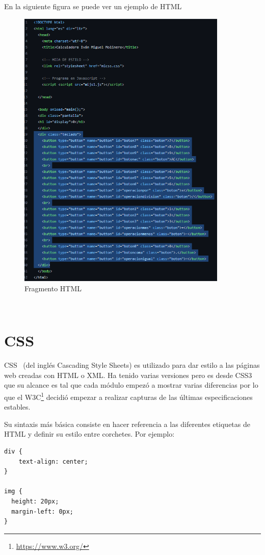 \documentclass[a4paper, 12pt]{book}
\begin{document}
En la siguiente figura se puede ver un ejemplo de HTML
\begin{figure}
  \centering
  \includegraphics[width=10cm, keepaspectratio]{img/html.png}
  \caption{Fragmento HTML}\label{fig:html}
\end{figure}
\\

\section{CSS}
\label{sec:CSS}

CSS~\cite{website:CSS} (del inglés Cascading Style Sheets) es utilizado para dar estilo a las páginas web creadas con HTML o XML. Ha tenido varias versiones pero es desde CSS3 que su alcance es tal que cada módulo empezó a mostrar varias diferencias por lo que el W3C\footnote{\url{https://www.w3.org/}}  decidió empezar a realizar capturas de las últimas especificaciones estables.

Su sintaxis más básica consiste en hacer referencia a las diferentes etiquetas de HTML y definir su estilo entre corchetes. Por ejemplo:

\begin{verbatim}
div {
    text-align: center;
}

img {
  height: 20px;
  margin-left: 0px;
}
\end{verbatim}
\end{document}
